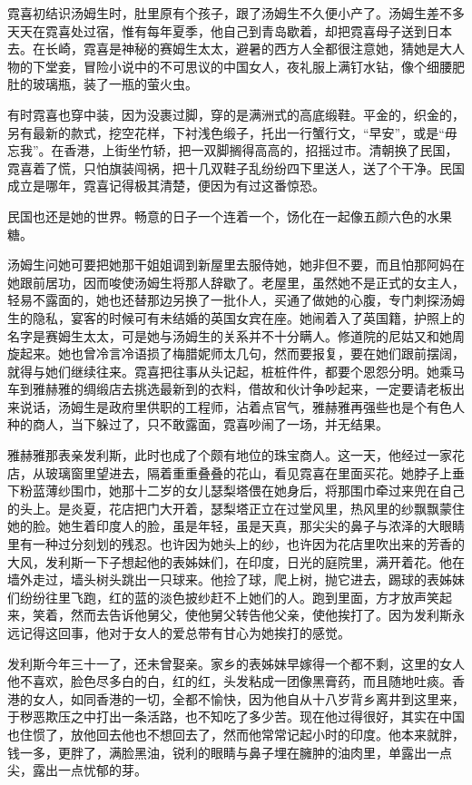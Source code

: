 \par 霓喜初结识汤姆生时，肚里原有个孩子，跟了汤姆生不久便小产了。汤姆生差不多天天在霓喜处过宿，惟有每年夏季，他自己到青岛歇着，却把霓喜母子送到日本去。在长崎，霓喜是神秘的赛姆生太太，避暑的西方人全都很注意她，猜她是大人物的下堂妾，冒险小说中的不可思议的中国女人，夜礼服上满钉水钻，像个细腰肥肚的玻璃瓶，装了一瓶的萤火虫。
\par 有时霓喜也穿中装，因为没裹过脚，穿的是满洲式的高底缎鞋。平金的，织金的，另有最新的款式，挖空花样，下衬浅色缎子，托出一行蟹行文，“早安”，或是“毋忘我”。在香港，上街坐竹轿，把一双脚搁得高高的，招摇过市。清朝换了民国，霓喜着了慌，只怕旗装闯祸，把十几双鞋子乱纷纷四下里送人，送了个干净。民国成立是哪年，霓喜记得极其清楚，便因为有过这番惊恐。
\par 民国也还是她的世界。畅意的日子一个连着一个，饧化在一起像五颜六色的水果糖。
\par 汤姆生问她可要把她那干姐姐调到新屋里去服侍她，她非但不要，而且怕那阿妈在她跟前居功，因而唆使汤姆生将那人辞歇了。老屋里，虽然她不是正式的女主人，轻易不露面的，她也还替那边另换了一批仆人，买通了做她的心腹，专门刺探汤姆生的隐私，宴客的时候可有未结婚的英国女宾在座。她闹着入了英国籍，护照上的名字是赛姆生太太，可是她与汤姆生的关系并不十分瞒人。修道院的尼姑又和她周旋起来。她也曾冷言冷语损了梅腊妮师太几句，然而要报复，要在她们跟前摆阔，就得与她们继续往来。霓喜把往事从头记起，桩桩件件，都要个恩怨分明。她乘马车到雅赫雅的绸缎店去挑选最新到的衣料，借故和伙计争吵起来，一定要请老板出来说话，汤姆生是政府里供职的工程师，沾着点官气，雅赫雅再强些也是个有色人种的商人，当下躲过了，只不敢露面，霓喜吵闹了一场，并无结果。
\par 雅赫雅那表亲发利斯，此时也成了个颇有地位的珠宝商人。这一天，他经过一家花店，从玻璃窗里望进去，隔着重重叠叠的花山，看见霓喜在里面买花。她脖子上垂下粉蓝薄纱围巾，她那十二岁的女儿瑟梨塔偎在她身后，将那围巾牵过来兜在自己的头上。是炎夏，花店把门大开着，瑟梨塔正立在过堂风里，热风里的纱飘飘蒙住她的脸。她生着印度人的脸，虽是年轻，虽是天真，那尖尖的鼻子与浓泽的大眼睛里有一种过分刻划的残忍。也许因为她头上的纱，也许因为花店里吹出来的芳香的大风，发利斯一下子想起他的表姊妹们，在印度，日光的庭院里，满开着花。他在墙外走过，墙头树头跳出一只球来。他捡了球，爬上树，抛它进去，踢球的表姊妹们纷纷往里飞跑，红的蓝的淡色披纱赶不上她们的人。跑到里面，方才放声笑起来，笑着，然而去告诉他舅父，使他舅父转告他父亲，使他挨打了。因为发利斯永远记得这回事，他对于女人的爱总带有甘心为她挨打的感觉。
\par 发利斯今年三十一了，还未曾娶亲。家乡的表姊妹早嫁得一个都不剩，这里的女人他不喜欢，脸色尽多白的白，红的红，头发粘成一团像黑膏药，而且随地吐痰。香港的女人，如同香港的一切，全都不愉快，因为他自从十八岁背乡离井到这里来，于秽恶欺压之中打出一条活路，也不知吃了多少苦。现在他过得很好，其实在中国也住惯了，放他回去他也不想回去了，然而他常常记起小时的印度。他本来就胖，钱一多，更胖了，满脸黑油，锐利的眼睛与鼻子埋在臃肿的油肉里，单露出一点尖，露出一点忧郁的芽。
